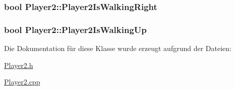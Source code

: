 \hypertarget{class_player2_a27e2e4fa537e02e01bff0a5867540fa6}{
\subsubsection[{Player2\-Is\-Walking\-Right}]{\setlength{\rightskip}{0pt plus 5cm}bool Player2\-::\-Player2\-Is\-Walking\-Right\hspace{0.3cm}{\ttfamily [private]}}}\label{class_player2_a27e2e4fa537e02e01bff0a5867540fa6}
\hypertarget{class_player2_a10ac2da1c761c4942333980d8bdcff4e}{
\subsubsection[{Player2\-Is\-Walking\-Up}]{\setlength{\rightskip}{0pt plus 5cm}bool Player2\-::\-Player2\-Is\-Walking\-Up\hspace{0.3cm}{\ttfamily [private]}}}\label{class_player2_a10ac2da1c761c4942333980d8bdcff4e}


Die Dokumentation für diese Klasse wurde erzeugt aufgrund der Dateien\-:\begin{DoxyCompactItemize}
\item 
\hyperlink{_player2_8h}{Player2.\-h}\item 
\hyperlink{_player2_8cpp}{Player2.\-cpp}\end{DoxyCompactItemize}
